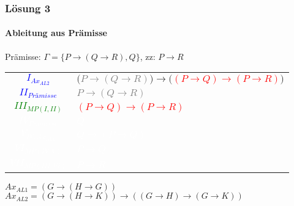 \begin{frame}
	\frametitle{Lösung 3}
	\framesubtitle{Ableitung aus Prämisse}
	Prämisse: $\Gamma =\{P\rightarrow(Q\rightarrow R), Q\}$, zz: $P\rightarrow R$\\
	\begin{tabular}{cl}
		\textcolor{blue}{$I_{Ax_{AL2}}$}            & $($\textcolor{gray}{$P\rightarrow(Q\rightarrow R)$}$)\rightarrow($\textcolor{red}{$(P\rightarrow Q)\rightarrow(P\rightarrow R)$}$)$ \\
		\textcolor{blue}{$II_{\textit{Prämisse}}$}  & \textcolor{gray}{$P\rightarrow(Q\rightarrow R)$}                                                                                    \\
		\textcolor{green}{$III_{MP(I, II)}$}        & \textcolor{red}{$(P\rightarrow Q)\rightarrow(P\rightarrow R)$}                                                                      \\
		\textcolor{white}{$IV_{\textit{Prämisse}}$} & \textcolor{white}{$Q$}                                                                                                              \\
		\textcolor{white}{$V_{IV, Ax_{AL1}}$}       & \textcolor{white}{$Q\rightarrow(P\rightarrow Q)$}                                                                                   \\
		\textcolor{white}{$VI_{MP(IV, V)}$}         & \textcolor{white}{$P\rightarrow Q$}                                                                                                 \\
		\textcolor{white}{$VII_{MP(III, VI)}$}      & \textcolor{white}{$P\rightarrow R$}                                                                                                 \\
	\end{tabular}
	$Ax_{AL1} = (G\rightarrow(H\rightarrow G))$\\
	$Ax_{AL2} = (G\rightarrow(H\rightarrow K))\rightarrow((G\rightarrow H)\rightarrow(G\rightarrow K))$\\
\end{frame}
